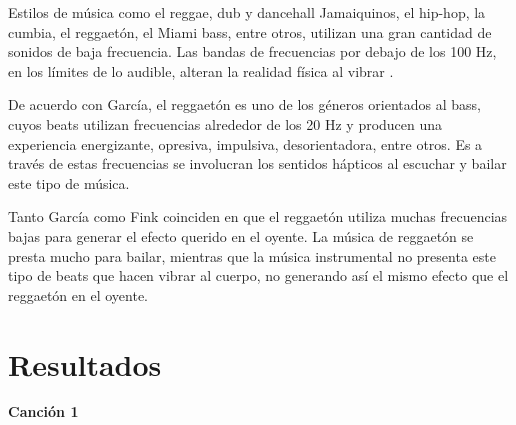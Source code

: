 \documentclass[12pt, letterpaper]{article}
\begin{document}
Estilos de música como el reggae, dub y dancehall Jamaiquinos, el hip-hop, la cumbia,
el reggaetón, el Miami bass, entre otros, utilizan una gran cantidad de sonidos de baja
frecuencia. Las bandas de frecuencias por debajo de los 100 Hz, en los límites
de lo audible, alteran la realidad física al vibrar \cite{fink-2018}.

De acuerdo con García\cite{Garcia-2016}, el reggaetón es uno de los géneros orientados al
bass, cuyos beats utilizan frecuencias alrededor de los 20 Hz y producen una experiencia
energizante, opresiva, impulsiva, desorientadora, entre otros. Es a través de estas
frecuencias se involucran los sentidos hápticos al escuchar y bailar este tipo de música.

Tanto García\cite{Garcia-2016} como Fink\cite{fink-2018} coinciden en que el reggaetón
utiliza muchas frecuencias bajas para generar el efecto querido en el oyente. La música
de reggaetón se presta mucho para bailar, mientras que la música instrumental no presenta
este tipo de beats que hacen vibrar al cuerpo, no generando así el mismo efecto
que el reggaetón en el oyente.

\section{Resultados}

\textbf{\large{Canción 1}}
\end{document}

